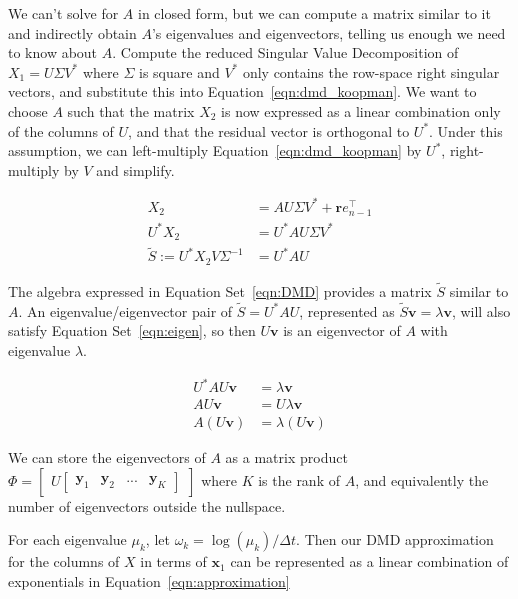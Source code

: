 \documentclass{article}
\begin{document}
We can't solve for $A$ in closed form, but we can compute a matrix similar to it and indirectly obtain $A$'s eigenvalues and eigenvectors, telling us enough we need to know about $A$. Compute the reduced Singular Value Decomposition of $X_1 = U\Sigma V^*$ where $\Sigma$ is square and $V^*$ only contains the row-space right singular vectors, and substitute this into Equation~\ref{eqn:dmd_koopman}. We want to choose $A$ such that the matrix $X_2$ is now expressed as a linear combination only of the columns of $U$, and that the residual vector is orthogonal to $U^*$. Under this assumption, we can left-multiply Equation~\ref{eqn:dmd_koopman} by $U^*$, right-multiply by $V$ and simplify. 

\begin{equation}
	\begin{split}
		X_2 &=AU\Sigma V^* + \mathbf{r}e^\top_{n-1}\\
		U^*X_2&=U^*AU\Sigma V^*\\
	\tilde{S} := U^*X_2V \Sigma^{-1}&=U^*AU
	\end{split}
	\label{eqn:DMD}
\end{equation}

The algebra expressed in Equation Set~\ref{eqn:DMD} provides a matrix $\tilde{S}$ similar to $A$. An eigenvalue/eigenvector pair of $\tilde{S}=U^*AU$,  represented as $\tilde{S}\mathbf{v}=\lambda \mathbf{v}$, will also satisfy Equation Set~\ref{eqn:eigen}, so then $U\mathbf{v}$ is an eigenvector of $A$ with eigenvalue $\lambda$.

\begin{equation}
	\begin{split}
	U^*AU\mathbf{v} &= \lambda \mathbf{v}\\
	AU\mathbf{v}&=U\lambda \mathbf{v}\\
	A(U\mathbf{v})&=\lambda(U\mathbf{v})
	\end{split}
	\label{eqn:eigen}
\end{equation}

We can store the eigenvectors of $A$ as a matrix product $\Phi = \begin{bmatrix}
	U\begin{bmatrix}
		\mathbf{y}_1 & \mathbf{y}_2 & ... & \mathbf{y}_K
	\end{bmatrix}
\end{bmatrix}$ where $K$ is the rank of $A$, and equivalently the number of eigenvectors outside the nullspace.

For each eigenvalue $\mu_k$, let $\omega_k = \log(\mu_k)/\Delta t$. Then our DMD approximation for the columns of $X$ in terms of $\mathbf{x}_1$ can be represented as a linear combination of exponentials in Equation~\ref{eqn:approximation}
\end{document}
